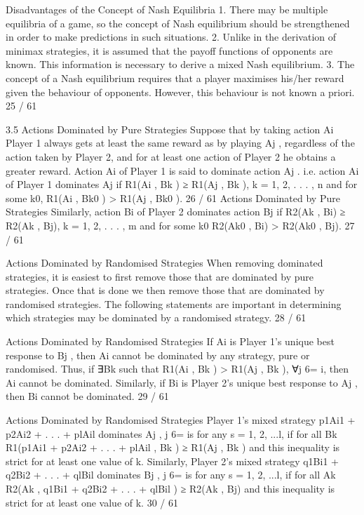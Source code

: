 Disadvantages of the Concept of Nash Equilibria
1. There may be multiple equilibria of a game, so the
concept of Nash equilibrium should be strengthened
in order to make predictions in such situations.
2. Unlike in the derivation of minimax strategies, it is
assumed that the payoff functions of opponents are
known. This information is necessary to derive a
mixed Nash equilibrium.
3. The concept of a Nash equilibrium requires that a
player maximises his/her reward given the behaviour
of opponents. However, this behaviour is not known
a priori.
25 / 61

3.5 Actions Dominated by Pure Strategies
Suppose that by taking action Ai Player 1 always gets at least the
same reward as by playing Aj
, regardless of the action taken by
Player 2, and for at least one action of Player 2 he obtains a
greater reward. Action Ai of Player 1 is said to dominate action Aj
.
i.e. action Ai of Player 1 dominates Aj
if
R1(Ai
, Bk ) ≥ R1(Aj
, Bk ), k = 1, 2, . . . , n
and for some k0, R1(Ai
, Bk0
) > R1(Aj
, Bk0
).
26 / 61
Actions Dominated by Pure Strategies
Similarly, action Bi of Player 2 dominates action Bj
if
R2(Ak , Bi) ≥ R2(Ak , Bj), k = 1, 2, . . . , m
and for some k0
R2(Ak0
, Bi) > R2(Ak0
, Bj).
27 / 61

Actions Dominated by Randomised Strategies
When removing dominated strategies, it is easiest to first remove
those that are dominated by pure strategies.
Once that is done we then remove those that are dominated by
randomised strategies.
The following statements are important in determining which
strategies may be dominated by a randomised strategy.
28 / 61

Actions Dominated by Randomised Strategies
If Ai
is Player 1’s unique best response to Bj
, then Ai cannot be
dominated by any strategy, pure or randomised.
Thus, if ∃Bk such that R1(Ai
, Bk ) > R1(Aj
, Bk ), ∀j 6= i, then Ai
cannot be dominated.
Similarly, if Bi
is Player 2’s unique best response to Aj
, then Bi
cannot be dominated.
29 / 61

Actions Dominated by Randomised Strategies
Player 1’s mixed strategy p1Ai1 + p2Ai2 + . . . + plAil
dominates Aj
,
j 6= is for any s = 1, 2, ...l, if for all Bk
R1(p1Ai1 + p2Ai2 + . . . + plAil
, Bk ) ≥ R1(Aj
, Bk )
and this inequality is strict for at least one value of k.
Similarly, Player 2’s mixed strategy q1Bi1 + q2Bi2 + . . . + qlBil
dominates Bj
, j 6= is for any s = 1, 2, ...l, if for all Ak
R2(Ak , q1Bi1 + q2Bi2 + . . . + qlBil
) ≥ R2(Ak , Bj)
and this inequality is strict for at least one value of k.
30 / 61

